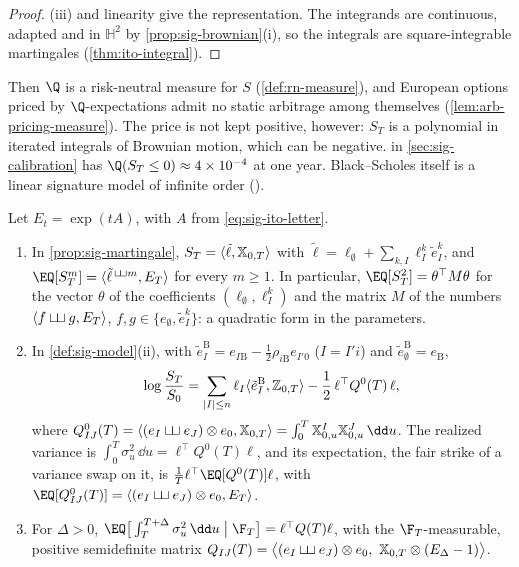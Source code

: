 \begin{proof}
(iii) and linearity give the representation. The integrands are continuous, adapted
and in $\mathbb H^2$ by \cref{prop:sig-brownian}(i), so the integrals are square-integrable martingales
(\cref{thm:ito-integral}).
\end{proof}

Then $\Q$ is a risk-neutral measure for $S$ (\cref{def:rn-measure}), and European options priced by
$\Q$-expectations admit no static arbitrage among themselves (\cref{lem:arb-pricing-measure}). The price is not
kept positive, however: $S_T$ is a polynomial in iterated integrals of Brownian motion, which can be negative.  in
\cref{sec:sig-calibration} has $\Q(S_T\le0)\approx4\times10^{-4}$ at one year. Black--Scholes itself is a
linear signature model of infinite order ().

\begin{proposition}\label{prop:sig-calibration}
Let $E_t=\exp(tA)$, with $A$ from \eqref{eq:sig-ito-letter}.
\begin{enumerate}[label=(\roman*)]
  \item In \cref{prop:sig-martingale}, $S_T=\langle\tilde\ell,\mathbb X_{0,T}\rangle$ with
    $\tilde\ell=\ell_\emptyset+\sum_{k,I}\ell^k_I\tilde e^k_I$, and $\EQ[S_T^m]=\langle\tilde\ell^{\,\sigsh m},E_T\rangle$ for every
    $m\ge1$. In particular, $\EQ[S_T^2]=\theta^\top M\theta$ for the vector $\theta$ of the coefficients
    $(\ell_\emptyset,\ell^k_I)$ and the matrix $M$ of the numbers $\langle f\mathbin{\sqcup\mkern-3mu\sqcup} g,E_T\rangle$, $f,g\in\{e_\emptyset,\tilde e^k_I\}$: a quadratic form in the
    parameters.
  \item In \cref{def:sig-model}(ii), with $\tilde e^{\mathrm B}_I=e_{I\mathrm B}-\frac12\rho_{i\mathrm B}e_{I'0}$
    ($I=I'i$) and $\tilde e^{\mathrm B}_\emptyset=e_{\mathrm B}$,
    \[
      \log\frac{S_T}{S_0}=\sum_{|I|\le n}\ell_I\langle\tilde e^{\mathrm B}_I,\mathbb Z_{0,T}\rangle-\frac12\,\ell^\top Q^0(T)\,\ell,
    \]
    where $Q^0_{IJ}(T)=\langle(e_I\sigsh e_J)\otimes e_0,\sigX_{0,T}\rangle=\int_0^T\sigX^I_{0,u}\sigX^J_{0,u}\,\dd u$.
    The realized variance is $\int_0^T\sigma_u^2\,\dd u=\ell^\top Q^0(T)\ell$, and its expectation, the fair strike
    of a variance swap on it, is $\frac1T\ell^\top\EQ[Q^0(T)]\ell$, with $\EQ[Q^0_{IJ}(T)]=\langle(e_I\sigsh e_J)\otimes e_0,E_T\rangle$.
  \item For $\Delta>0$, $\EQ\big[\int_T^{T+\Delta}\sigma_u^2\,\dd u\bigm|\F_T\big]=\ell^\top Q(T)\ell$, with the
    $\F_T$-measurable, positive semidefinite matrix
    $Q_{IJ}(T)=\big\langle(e_I\sigsh e_J)\otimes e_0,\ \sigX_{0,T}\otimes(E_\Delta-1)\big\rangle$.
\end{enumerate}
\end{proposition}

